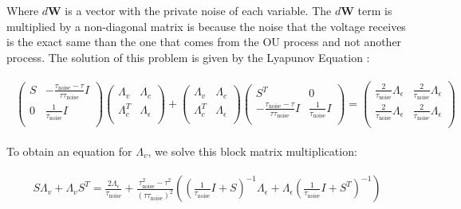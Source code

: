 \documentclass[11pt]{article}
\begin{document}
Where $d\mathbf{W}$ is a vector with the private noise of each variable.  The $d\mathbf{W}$ term is multiplied by a non-diagonal matrix is because the noise that the voltage receives is the exact same than the one that comes from the OU process and not another process. The solution of this problem is given by the Lyapunov Equation \cite{hennequin2018dynamical,Gardiner2009}:

\begin{align}
\begin{split}
\begin{pmatrix}
	S & -\frac{\tau_{\text{noise}}-\tau}{\tau \tau_{\text{noise}}}I\\
	 0&\frac{1}{\tau_{\text{noise}}}I\\
\end{pmatrix}
\begin{pmatrix}
	\Lambda_v & \Lambda_c\\
	 \Lambda_c^T&\Lambda_\epsilon\\
\end{pmatrix}
+
\begin{pmatrix}
	\Lambda_v & \Lambda_c\\
	 \Lambda_c ^T &\Lambda_\epsilon\\
\end{pmatrix}
\begin{pmatrix}
	S^T & 0\\
	 -\frac{\tau_{\text{noise}}-\tau}{\tau \tau_{\text{noise}}}I&\frac{1}{\tau_{\text{noise}}}I\\
\end{pmatrix}
=
\begin{pmatrix}
	\frac{2}{\tau_{\text{noise}}} \Lambda_\epsilon&\frac{2}{\tau_{\text{noise}}} \Lambda_\epsilon\\
	\frac{2}{\tau_{\text{noise}}} \Lambda_\epsilon&\frac{2}{\tau_{\text{noise}}} \Lambda_\epsilon \\
	\end{pmatrix}
\end{split}
\end{align}

To obtain an equation for $\Lambda_v$, we solve this block matrix multiplication:


\begin{align}
\begin{split}
S\Lambda_v +\Lambda_v S^T =\frac{2 \Lambda_\epsilon }{\tau_{\text{noise}} }+\frac{\tau_{\text{noise}}^2 -\tau^2 }{(\tau  \tau_{\text{noise}} )^2}\left( (\frac{1}{\tau_{\text{noise}}}I + S)^{-1} \Lambda_\epsilon+   \Lambda_\epsilon(\frac{1}{\tau_{\text{noise}}}I + S^T)^{-1}\right)  \\
\end{split}
\end{align}
\end{document}
